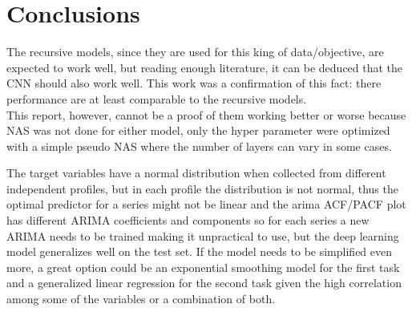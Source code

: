 \section{Conclusions}
The recursive models, since they are used for this king of data/objective, are expected to work well, but reading enough literature\cite{cnn_time}\cite{cnn_time_2}, it can be deduced that the CNN should also work well. This work was a confirmation of this fact: there performance are at least comparable to the recursive models. \\
This report, however, cannot be a proof of them working better or worse because NAS was not done for either model, only the hyper parameter were optimized with a simple pseudo NAS where the number of layers can vary in some cases.

The target variables have a normal distribution when collected from different independent profiles, but in each profile the distribution is not normal, thus the optimal predictor for a series might not be linear and the arima ACF/PACF plot has different ARIMA coefficients and components so for each series a new ARIMA needs to be trained making it unpractical to use, but the deep learning model generalizes well on the test set. If the model needs to be simplified even more, a great option could be an exponential smoothing model for the first task and a generalized linear regression for the second task given the high correlation among some of the variables or a combination of both.

